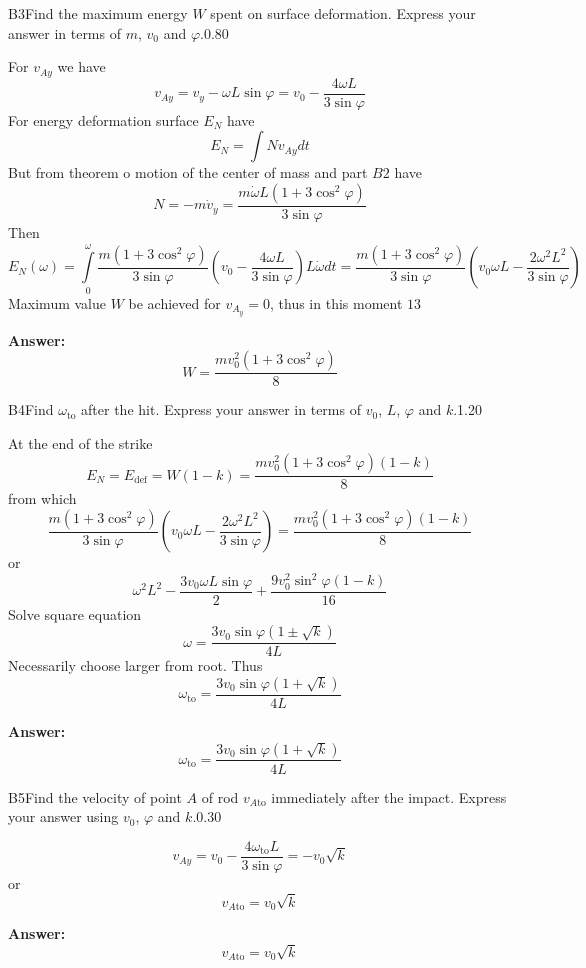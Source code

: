 \documentclass[11pt,a4paper]{article}
\begin{document}
\begin{solcard}{B3}{Find the maximum energy $W$ spent on surface deformation. Express your answer in terms of $m$, $v_0$ and $\varphi$.}{0.80}

For $v_{Ay}$ we have $$v_{Ay}=v_y-\omega L\sin\varphi=v_0-\frac{4\omega L}{3\sin\varphi} $$ For energy deformation surface $E_N$ have $$E_N=\int Nv_{Ay}dt $$ But from theorem o motion of the center of mass and part $B2$ have $$N=-m\dot{v}_y=\frac{m\dot{\omega}L(1+3\cos^2\varphi)}{3\sin\varphi} $$ Then $$E_N(\omega)=\int\limits_0^{\omega}\frac{m(1+3\cos^2\varphi)}{3\sin\varphi}\left(v_0-\frac{4\omega L}{3\sin\varphi}\right)L\dot{\omega}dt=\frac{m(1+3\cos^2\varphi)}{3\sin\varphi}\left(v_0 \omega L-\frac{2\omega^2L^2}{3\sin\varphi}\right) $$ Maximum value $W$ be achieved for $v_{A_y}=0$, thus in this moment $13 $

\par\smallskip\noindent\textbf{Answer:} $$W=\frac{mv^2_0(1+3\cos^2\varphi)}{8} $$
\end{solcard}

\begin{solcard}{B4}{Find $\omega_{\text{to}}$ after the hit. Express your answer in terms of $v_0$, $L$, $\varphi$ and $k$.}{1.20}

At the end of the strike $$E_N=E_{\text{def}}=W(1-k)=\frac{mv^2_0(1+3\cos^2\varphi)(1-k)}{8} $$ from which $$\frac{m(1+3\cos^2\varphi)}{3\sin\varphi}\left(v_0 \omega L-\frac{2\omega^2L^2}{3\sin\varphi}\right)=\frac{mv^2_0(1+3\cos^2\varphi)(1-k)}{8} $$ or $$\omega^2L^2-\frac{3v_0\omega L\sin\varphi}{2}+\frac{9v^2_0\sin^2\varphi(1-k)}{16} $$ Solve square equation $$\omega=\frac{3v_0\sin\varphi(1\pm{\sqrt{k}})}{4L} $$ Necessarily choose larger from root. Thus $$\omega_{\text{to}}=\frac{3v_0\sin\varphi(1+\sqrt{k})}{4L} $$

\par\smallskip\noindent\textbf{Answer:} $$\omega_{\text{to}}=\frac{3v_0\sin\varphi(1+\sqrt{k})}{4L} $$
\end{solcard}

\begin{solcard}{B5}{Find the velocity of point $A$ of rod $v_{A\text{to}}$ immediately after the impact. Express your answer using $v_0$, $\varphi$ and $k$.}{0.30}

$$v_{Ay}=v_0-\frac{4\omega_{\text{to}}L}{3\sin\varphi}=-v_0\sqrt{k} $$ or $$v_{A\text{to}}=v_0\sqrt{k} $$

\par\smallskip\noindent\textbf{Answer:} $$v_{A\text{to}}=v_0\sqrt{k} $$
\end{solcard}
\end{document}
